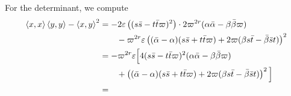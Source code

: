 For the determinant, we compute
\begin{align*}
  \left\langle x,x \right\rangle \left\langle y,y \right\rangle
  - \left\langle x,y \right\rangle^2
  &= -2\varepsilon\left( (s \bar s - t \bar t \varpi)^2 \right)
    \cdot 2\varpi^{2r} (\alpha \bar\alpha - \beta\bar\beta \varpi) \\
  &\qquad- \varpi^{2r} \varepsilon \left(
    (\bar\alpha - \alpha)(s \bar s + t \bar t \varpi)
    + 2\varpi(\beta s \bar t - \bar\beta \bar s t) \right)^2 \\
  &= -\varpi^{2r}\varepsilon \Big[
    4 (s \bar s - t \bar t \varpi)^2 (\alpha \bar \alpha - \beta \bar\beta \varpi) \\
    &\qquad+ \left( (\bar\alpha - \alpha)(s \bar s + t \bar t \varpi)
    + 2\varpi(\beta s \bar t - \bar\beta \bar s t) \right)^2
    \Big] \\
  &=
\end{align*}
